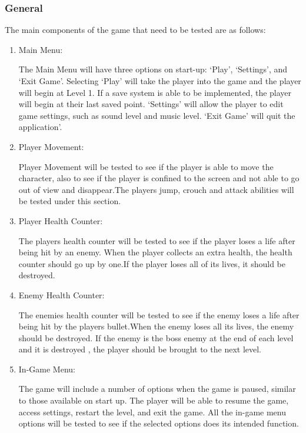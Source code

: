 \documentclass{article}
\begin{document}
\subsubsection{General}
The main components of the game that need to be tested are as follows:
\begin{enumerate}
    \item Main Menu:
    
    The Main Menu will have three options on start-up: ‘Play’, ‘Settings’, and ‘Exit Game’.
    Selecting ‘Play’ will take the player into the game and the player will begin at Level 1.
    If a save system is able to be implemented, the player will begin at their last saved
    point. ‘Settings’ will allow the player to edit game settings, such as sound level and
    music level. ‘Exit Game’ will quit the application’.
    \item Player Movement:
    
    Player Movement will be tested to see if the player is able to move the character, also to see if the player is confined to the screen and not able to go out of view and disappear.The players jump, crouch and attack abilities will be tested under this section.
    \item Player Health Counter:
    
    The players health counter will be tested to see if the player loses a life after being hit by an enemy. When the player collects an extra health, the health counter should go up by one.If the player loses all of its lives, it should be destroyed.
    \item Enemy Health Counter:
    
    The enemies health counter will be tested to see if the enemy loses a life after being hit by the players bullet.When the enemy loses all its lives, the enemy should be destroyed. If the enemy is the boss enemy at the end of each level and it is destroyed , the player should be brought to the next level.
    \item In-Game Menu:
    
    The game will include a number of options when the game is paused, similar to those
    available on start up. The player will be able to resume the game, access settings,
    restart the level, and exit the game. All the in-game menu options will be tested to see if the selected options does its intended function.
    
\end{enumerate}

\newpage
\end{document}
